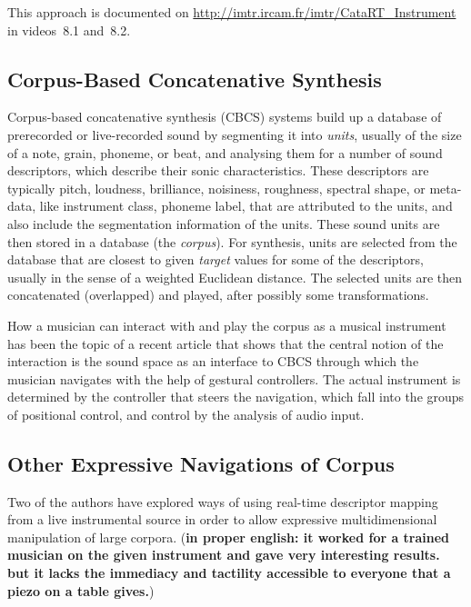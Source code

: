 This approach is documented on \url{http://imtr.ircam.fr/imtr/CataRT_Instrument} in videos~8.1 and~8.2.


\subsection{Corpus-Based Concatenative Synthesis}

Corpus-based concatenative synthesis (CBCS) \cite{Schwarz-ieeespm2007-concat} systems build up a database of prerecorded or live-recorded sound by segmenting it into
\textit{units}, usually of the size of a note, grain, phoneme, or beat, and analysing them for a
number of sound descriptors, which describe their sonic characteristics.
These descriptors are typically pitch, loudness, brilliance, noisiness, roughness, spectral shape, or meta-data, like instrument class, phoneme label, that are attributed to the units,
and also include the segmentation information of the units.
These sound units are then stored in a database (the \textit{corpus}).  For synthesis, units are
selected from the database that are closest to given \textit{target} values for some of the
descriptors, usually in the sense of a weighted Euclidean distance.
The selected units are then concatenated (overlapped) and played, after possibly some transformations.

How a musician can interact with and play the corpus as a musical instrument has been the topic of a recent article \cite{Schwarz-nime2012-sound-space} that shows that the central notion of the interaction is the sound space as an interface to CBCS through which the musician navigates with the help of gestural controllers.  
The actual instrument is determined by the controller that steers the
navigation, which fall into the groups of positional control, and control by the analysis of audio
input.

\subsection{Other Expressive Navigations of Corpus}

Two of the authors have explored ways of using real-time descriptor mapping from a live instrumental source in order to allow expressive multidimensional manipulation of large corpora. (\textbf{in proper english: it worked for a trained musician on the given instrument and gave very interesting results. but it lacks the immediacy and tactility accessible to everyone that a piezo on a table gives.})

